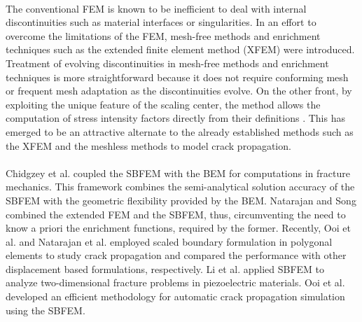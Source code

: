 \paragraph{}
The conventional FEM is known to be inefficient to deal with internal discontinuities such as material interfaces or singularities.
In an effort to overcome the limitations of the FEM, mesh-free methods and enrichment techniques such as the extended finite element method (XFEM) were introduced.
Treatment of evolving discontinuities in mesh-free methods \citep{doi:10.1002/nme.1151,Rabczuk2007} and enrichment techniques \citep{Babuška20031,doi:10.1002/nme.1966,CHAUDINH2012242,AREIAS2013113} is more straightforward because it does not require conforming mesh or frequent mesh adaptation as the discontinuities evolve.
On the other front, by exploiting the unique feature of the scaling center, the method allows the computation of stress intensity factors directly from their definitions \citep{Dee2005,SONG2002183}.
This has emerged to be an attractive alternate to the already established methods such as the XFEM and the meshless methods to model crack propagation.

\paragraph{}
Chidgzey et al. \citep{CHIDGZEY20081198,BIRD2010599} coupled the SBFEM with the BEM for computations in fracture mechanics.
This framework combines the semi-analytical solution accuracy of the SBFEM with the geometric flexibility provided by the BEM.
Natarajan and Song \citep{doi:10.1002/nme.4557} combined the extended FEM and the SBFEM, thus, circumventing the need to know a priori the enrichment functions, required by the former.
Recently, Ooi et al. \citep{doi:10.1002/nme.4284} and Natarajan et al.\citep{NATARAJAN2014101} employed scaled boundary formulation in polygonal elements to study crack propagation and compared the performance with other displacement based formulations, respectively.
Li et al.\citep{LI201352} applied SBFEM to analyze two-dimensional fracture problems in piezoelectric materials.
Ooi et al.\citep{doi:10.1002/nme.4284,OOI20101178,OOI20131} developed an efficient methodology for automatic crack propagation simulation using the SBFEM.

